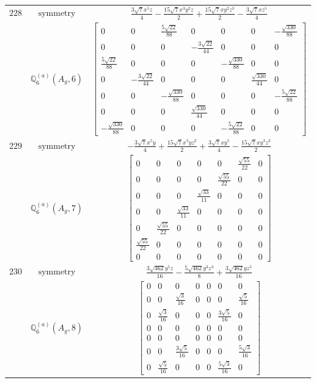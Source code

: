 \documentclass[fleqn,8pt,landscape]{jsarticle}
\begin{document}
\begin{longtable}{ccc}
$ 228 $ & $ \text{symmetry} $ & $ \frac{3 \sqrt{7} x^{5} z}{4} - \frac{15 \sqrt{7} x^{3} y^{2} z}{2} + \frac{15 \sqrt{7} x y^{2} z^{3}}{2} - \frac{3 \sqrt{7} x z^{5}}{4} $ \\
$  $ & $ \mathbb{Q}_{6}^{(a)}(A_{g},6) $ & $ \begin{bmatrix} 0 & 0 & \frac{5 \sqrt{22}}{88} & 0 & 0 & 0 & - \frac{\sqrt{330}}{88} \\ 0 & 0 & 0 & - \frac{3 \sqrt{22}}{44} & 0 & 0 & 0 \\ \frac{5 \sqrt{22}}{88} & 0 & 0 & 0 & - \frac{\sqrt{330}}{88} & 0 & 0 \\ 0 & - \frac{3 \sqrt{22}}{44} & 0 & 0 & 0 & \frac{\sqrt{330}}{44} & 0 \\ 0 & 0 & - \frac{\sqrt{330}}{88} & 0 & 0 & 0 & - \frac{5 \sqrt{22}}{88} \\ 0 & 0 & 0 & \frac{\sqrt{330}}{44} & 0 & 0 & 0 \\ - \frac{\sqrt{330}}{88} & 0 & 0 & 0 & - \frac{5 \sqrt{22}}{88} & 0 & 0 \end{bmatrix} $ \\ \hline
$ 229 $ & $ \text{symmetry} $ & $ - \frac{3 \sqrt{7} x^{5} y}{4} + \frac{15 \sqrt{7} x^{3} y z^{2}}{2} + \frac{3 \sqrt{7} x y^{5}}{4} - \frac{15 \sqrt{7} x y^{3} z^{2}}{2} $ \\
$  $ & $ \mathbb{Q}_{6}^{(a)}(A_{g},7) $ & $ \begin{bmatrix} 0 & 0 & 0 & 0 & 0 & \frac{\sqrt{55}}{22} & 0 \\ 0 & 0 & 0 & 0 & \frac{\sqrt{55}}{22} & 0 & 0 \\ 0 & 0 & 0 & \frac{\sqrt{33}}{11} & 0 & 0 & 0 \\ 0 & 0 & \frac{\sqrt{33}}{11} & 0 & 0 & 0 & 0 \\ 0 & \frac{\sqrt{55}}{22} & 0 & 0 & 0 & 0 & 0 \\ \frac{\sqrt{55}}{22} & 0 & 0 & 0 & 0 & 0 & 0 \\ 0 & 0 & 0 & 0 & 0 & 0 & 0 \end{bmatrix} $ \\ \hline
$ 230 $ & $ \text{symmetry} $ & $ \frac{3 \sqrt{462} y^{5} z}{16} - \frac{5 \sqrt{462} y^{3} z^{3}}{8} + \frac{3 \sqrt{462} y z^{5}}{16} $ \\
$  $ & $ \mathbb{Q}_{6}^{(a)}(A_{g},8) $ & $ \begin{bmatrix} 0 & 0 & 0 & 0 & 0 & 0 & 0 \\ 0 & 0 & \frac{\sqrt{3}}{16} & 0 & 0 & 0 & \frac{\sqrt{5}}{16} \\ 0 & \frac{\sqrt{3}}{16} & 0 & 0 & 0 & \frac{3 \sqrt{5}}{16} & 0 \\ 0 & 0 & 0 & 0 & 0 & 0 & 0 \\ 0 & 0 & 0 & 0 & 0 & 0 & 0 \\ 0 & 0 & \frac{3 \sqrt{5}}{16} & 0 & 0 & 0 & \frac{5 \sqrt{3}}{16} \\ 0 & \frac{\sqrt{5}}{16} & 0 & 0 & 0 & \frac{5 \sqrt{3}}{16} & 0 \end{bmatrix} $ \\ \hline

\end{longtable}
\end{document}
